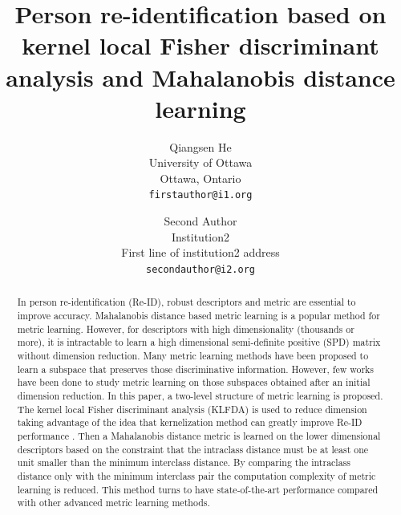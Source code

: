 \documentclass[10pt,twocolumn,letterpaper]{article}
\begin{document}
\title{Person re-identification based on kernel local Fisher discriminant analysis and Mahalanobis distance learning}

\author{Qiangsen He\\
University of Ottawa\\
Ottawa, Ontario\\
{\tt\small firstauthor@i1.org}
\and
Second Author\\
Institution2\\
First line of institution2 address\\
{\tt\small secondauthor@i2.org}
}

\maketitle


\begin{abstract}
   In person re-identification (Re-ID), robust descriptors and metric are essential to improve accuracy. Mahalanobis distance based metric learning is a popular method for metric learning. However, for descriptors with high dimensionality (thousands or more), it is intractable to learn a high dimensional semi-definite positive (SPD) matrix without dimension reduction.  Many metric learning methods have been proposed to learn a subspace that preserves those discriminative information. However, few works have been done to study metric learning on those subspaces obtained after an initial dimension reduction. In this paper, a two-level structure of metric learning is proposed. The kernel local Fisher discriminant analysis (KLFDA) is used to reduce dimension taking advantage of the idea that kernelization method can greatly improve Re-ID performance \cite{KernelVersionMetrics}. Then a Mahalanobis distance metric is learned on the lower dimensional descriptors based on the constraint that the intraclass distance must be at least one unit smaller than the minimum interclass distance. By comparing the intraclass distance only with the minimum interclass pair the computation complexity of metric learning is reduced. This method turns to have state-of-the-art performance compared with other advanced metric learning methods.
\end{abstract}
\end{document}
